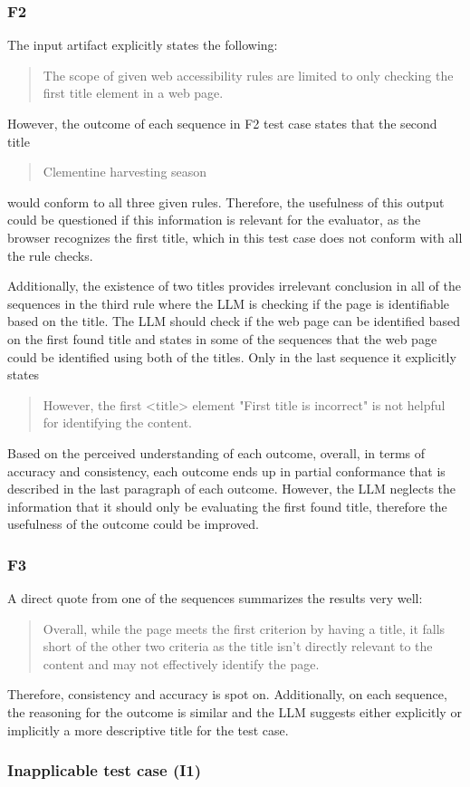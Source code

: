 \subsubsection{F2}

The input artifact explicitly states the following: \blockquote{The scope of given web accessibility rules are limited to only checking the first title element in a web page.}. However, the outcome of each sequence in F2 test case states that the second title \blockquote{Clementine harvesting season} would conform to all three given rules. Therefore, the usefulness of this output could be questioned if this information is relevant for the evaluator, as the browser recognizes the first title, which in this test case does not conform with all the rule checks.

Additionally, the existence of two titles provides irrelevant conclusion in all of the sequences in the third rule where the LLM is checking if the page is identifiable based on the title. The LLM should check if the web page can be identified based on the first found title and states in some of the sequences that the web page could be identified using both of the titles. Only in the last sequence it explicitly states \blockquote{However, the first <title> element "First title is incorrect" is not helpful for identifying the content.}

Based on the perceived understanding of each outcome, overall, in terms of accuracy and consistency, each outcome ends up in partial conformance that is described in the last paragraph of each outcome. However, the LLM neglects the information that it should only be evaluating the first found title, therefore the usefulness of the outcome could be improved.

\subsubsection{F3}

A direct quote from one of the sequences summarizes the results very well: \blockquote{Overall, while the page meets the first criterion by having a title, it falls short of the other two criteria as the title isn't directly relevant to the content and may not effectively identify the page.}. Therefore, consistency and accuracy is spot on. Additionally, on each sequence, the reasoning for the outcome is similar and the LLM suggests either explicitly or implicitly a more descriptive title for the test case.

\subsubsection{Inapplicable test case (I1)}

